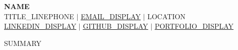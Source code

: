 \documentclass[a4paper,11pt]{article}
\begin{document}
\begin{center}
    \textbf{\Huge \scshape {{NAME}}} \\ \vspace{2pt}
    {{TITLE_LINE}}\small {{PHONE}} $|$
    \href{{{EMAIL_URL}}}{\underline{{{EMAIL_DISPLAY}}}} $|$
    {{LOCATION}} \\ \vspace{1pt}
    \small \href{{{LINKEDIN_URL}}}{\underline{{{LINKEDIN_DISPLAY}}}} $|$
    \href{{{GITHUB_URL}}}{\underline{{{GITHUB_DISPLAY}}}} $|$
    \href{{{PORTFOLIO_URL}}}{\underline{{{PORTFOLIO_DISPLAY}}}}
\end{center}

%

{{SUMMARY}}
\end{document}

